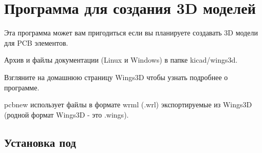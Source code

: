 \section{Программа  для создания 3D моделей}

Эта программа может вам пригодиться если вы планируете создавать 3D модели для PCB элементов.

Архив и файлы документации (Linux и Windows) в папке kicad/wings3d.

Взгляните на домашнюю страницу Wings3D чтобы узнать подробнее о программе.

pcbnew использует файлы в формате wrml (.wrl) экспортируемые из Wings3D (родной формат Wings3D - это .wings).

\subsection{Установка  под \win}




% 
